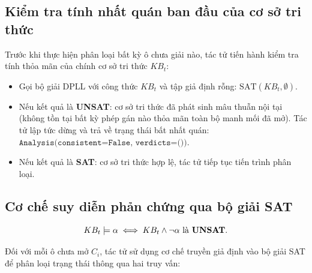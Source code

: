\subsection{Kiểm tra tính nhất quán ban đầu của cơ sở tri thức}
Trước khi thực hiện phân loại bất kỳ ô chưa giải nào, tác tử tiến hành kiểm tra tính thỏa mãn của chính cơ sở tri thức $KB_t$:
\begin{itemize}
    \item Gọi bộ giải DPLL với công thức $KB_t$ và tập giả định rỗng: $\text{SAT}(KB_t, \emptyset)$.
    \item Nếu kết quả là \textbf{UNSAT}: cơ sở tri thức đã phát sinh mâu thuẫn nội tại (không tồn tại bất kỳ phép gán nào thỏa mãn toàn bộ manh mối đã mở). Tác tử lập tức dừng và trả về trạng thái bất nhất quán: $\texttt{Analysis(consistent=False, verdicts=())}$.
    \item Nếu kết quả là \textbf{SAT}: cơ sở tri thức hợp lệ, tác tử tiếp tục tiến trình phân loại.
\end{itemize}

\subsection{Cơ chế suy diễn phản chứng qua bộ giải SAT}
\begin{equation}
    KB_t \models \alpha \iff KB_t \wedge \neg \alpha \text{ là \textbf{UNSAT}}.
\end{equation}

Đối với mỗi ô chưa mở $C_i$, tác tử sử dụng cơ chế truyền giả định vào bộ giải SAT để phân loại trạng thái thông qua hai truy vấn:


